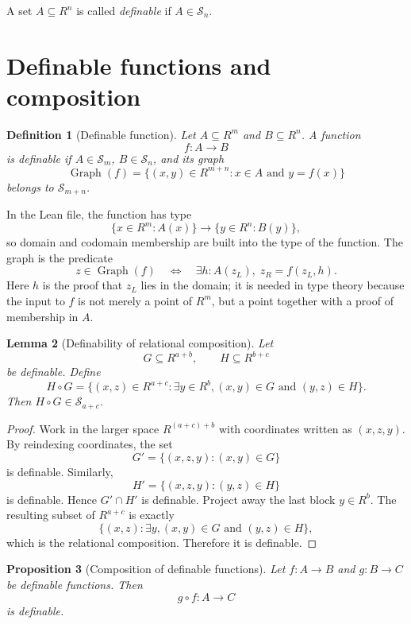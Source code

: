 \documentclass[11pt]{article}
\newtheorem{definition}{Definition}[section]
\newtheorem{lemma}[definition]{Lemma}
\newtheorem{proposition}[definition]{Proposition}
\newcommand{\Graph}{\operatorname{Graph}}
\begin{document}
A set $A\subseteq R^n$ is called \emph{definable} if $A\in\mathcal S_n$.

\section{Definable functions and composition}

\begin{definition}[Definable function]
Let $A\subseteq R^m$ and $B\subseteq R^n$. A function
\[
  f:A\to B
\]
is \emph{definable} if $A\in\mathcal S_m$, $B\in\mathcal S_n$, and its graph
\[
  \Graph(f)=\{(x,y)\in R^{m+n}:x\in A\text{ and }y=f(x)\}
\]
belongs to $\mathcal S_{m+n}$.
\end{definition}

In the Lean file, the function has type
\[
  \{x\in R^m:A(x)\}\to \{y\in R^n:B(y)\},
\]
so domain and codomain membership are built into the type of the function. The graph is the predicate
\[
  z\in\Graph(f)
  \quad\Longleftrightarrow\quad
  \exists h:A(z_L),\;z_R=f(z_L,h).
\]
Here $h$ is the proof that $z_L$ lies in the domain; it is needed in type theory because the input to $f$ is not merely a point of $R^m$, but a point together with a proof of membership in $A$.

\begin{lemma}[Definability of relational composition]
Let
\[
  G\subseteq R^{a+b},\qquad H\subseteq R^{b+c}
\]
be definable. Define
\[
  H\circ G
  =\{(x,z)\in R^{a+c}:\exists y\in R^b,
      (x,y)\in G\text{ and }(y,z)\in H\}.
\]
Then $H\circ G\in\mathcal S_{a+c}$.
\end{lemma}

\begin{proof}
Work in the larger space $R^{(a+c)+b}$ with coordinates written as $(x,z,y)$.
By reindexing coordinates, the set
\[
  G'=\bigl\{(x,z,y):(x,y)\in G\bigr\}
\]
is definable. Similarly,
\[
  H'=\bigl\{(x,z,y):(y,z)\in H\bigr\}
\]
is definable. Hence $G'\cap H'$ is definable. Project away the last block $y\in R^b$. The resulting subset of $R^{a+c}$ is exactly
\[
  \{(x,z):\exists y,
      (x,y)\in G\text{ and }(y,z)\in H\},
\]
which is the relational composition. Therefore it is definable.
\end{proof}

\begin{proposition}[Composition of definable functions]
Let $f:A\to B$ and $g:B\to C$ be definable functions. Then
\[
  g\circ f:A\to C
\]
is definable.
\end{proposition}
\end{document}
